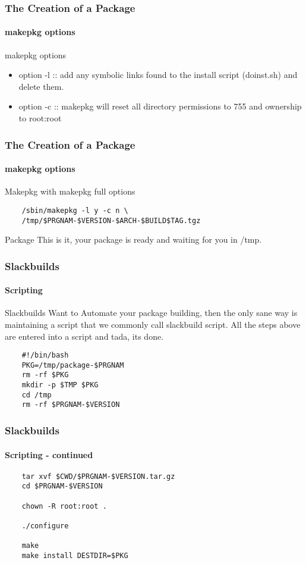 \documentclass[12pt,hyperref={pdfpagelabels=true}]{beamer}
\begin{document}
\begin{frame}
  \frametitle{The Creation of a Package}
  \framesubtitle{makepkg options}
  \begin{example}{makepkg options}
    \begin{itemize}[<+-| alert@+>]
    \item option -l :: add any symbolic links found to the install script
      (doinst.sh) and delete them.
    \item option -c :: makepkg will reset all directory permissions to 755 and
      ownership to root:root
    \end{itemize}
  \end{example}
\end{frame}

\begin{frame}[fragile]
  \frametitle{The Creation of a Package}
  \framesubtitle{makepkg options}
  \begin{block}{Makepkg}
    with makepkg full options
  \end{block}
  
  \begin{lstlisting}
    /sbin/makepkg -l y -c n \
    /tmp/$PRGNAM-$VERSION-$ARCH-$BUILD$TAG.tgz
  \end{lstlisting}
  
  \pause

  \begin{block}{Package}
    This is it, your package is ready and waiting for you in /tmp.
  \end{block}
\end{frame}


\begin{frame}[fragile]
  \frametitle{Slackbuilds}
  \framesubtitle{Scripting}
  \begin{block}{Slackbuilds}
    Want to Automate your package building, then the only sane way is
    maintaining a script that we commonly call slackbuild script.
    All the steps above are entered into a script and tada, its done.
  \end{block}

  \pause

  \begin{lstlisting}
    #!/bin/bash
    PKG=/tmp/package-$PRGNAM
    rm -rf $PKG
    mkdir -p $TMP $PKG
    cd /tmp
    rm -rf $PRGNAM-$VERSION
  \end{lstlisting}
\end{frame}

\begin{frame}[fragile]
  \frametitle{Slackbuilds}
  \framesubtitle{Scripting - continued}

  \begin{lstlisting}
    tar xvf $CWD/$PRGNAM-$VERSION.tar.gz
    cd $PRGNAM-$VERSION
    
    chown -R root:root .
    
    ./configure
    
    make
    make install DESTDIR=$PKG
  \end{lstlisting}
\end{frame}
\end{document}
